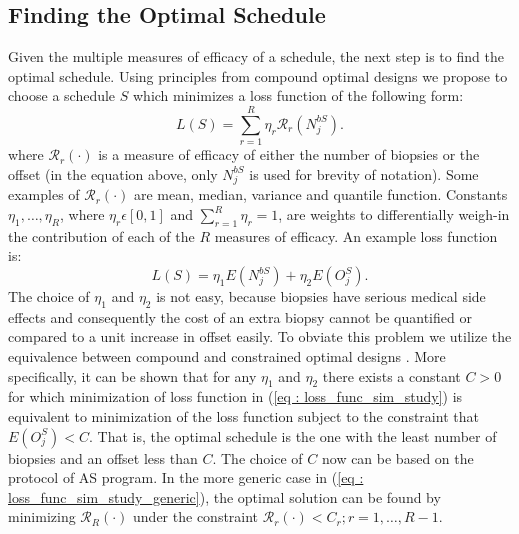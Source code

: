 \subsection{Finding the Optimal Schedule}
Given the multiple measures of efficacy of a schedule, the next step is to find the optimal schedule. Using principles from compound optimal designs \citep{lauter1976optimal} we propose to choose a schedule $S$ which minimizes a loss function of the following form:
\begin{equation}
\label{eq : loss_func_sim_study_generic}
L(S) = \sum_{r=1}^R \eta_r \mathcal{R}_r(N^{bS}_j).
\end{equation}
where $\mathcal{R}_r(\cdot)$ is a measure of efficacy of either the number of biopsies or the offset (in the equation above, only $N^{bS}_j$ is used for brevity of notation). Some examples of $\mathcal{R}_r(\cdot)$ are mean, median, variance and quantile function. Constants $\eta_1, \ldots, \eta_R$, where $\eta_r \epsilon [0,1]$ and $\sum_{r=1}^R \eta_r = 1$, are weights to differentially weigh-in the contribution of each of the $R$ measures of efficacy. An example loss function is:
\begin{equation}
\label{eq : loss_func_sim_study}
L(S) = \eta_1 E(N^{bS}_j) + \eta_2 E(O^S_j). 
\end{equation}
The choice of $\eta_1$ and $\eta_2$ is not easy, because biopsies have serious medical side effects and consequently the cost of an extra biopsy cannot be quantified or compared to a unit increase in offset easily. To obviate this problem we utilize the equivalence between compound and constrained optimal designs \citep{cook1994equivalence}. More specifically, it can be shown that for any $\eta_1$ and $\eta_2$ there exists a constant $C>0$ for which minimization of loss function in (\ref{eq : loss_func_sim_study}) is equivalent to minimization of the loss function subject to the constraint that $E(O^S_j) < C$. That is, the optimal schedule is the one with the least number of biopsies and an offset less than $C$. The choice of $C$ now can be based on the protocol of AS program. In the more generic case in (\ref{eq : loss_func_sim_study_generic}), the optimal solution can be found by minimizing $\mathcal{R}_R(\cdot)$ under the constraint $\mathcal{R}_r(\cdot) < C_r; r=1, \ldots, R-1$.